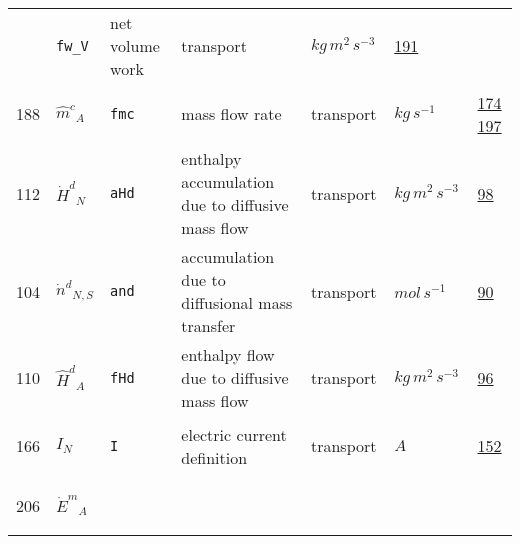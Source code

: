 \begin{longtable}{|p{1cm}|p{2.5cm}|p{4.5cm}|p{8cm}|p{3.0cm}|p{3cm}|p{1cm}|}
             & \verb|fw_V|
             & net volume work
             & \begin{lay}transport \end{lay}
             & $ kg \,m^{2} \,s^{-3} \, $
             &                 \hyperlink{"e:191"}{ 191 }
                 \\
            188
             & \hypertarget{"v:188"}{ $ {{\hat{m}^c}}{_{A}} $}
             & \verb|fmc|
             & mass flow rate 
             & \begin{lay}transport \end{lay}
             & $ kg \,s^{-1} \, $
             &                 \hyperlink{"e:174"}{ 174 }
                                 \hyperlink{"e:197"}{ 197 }
                 \\
            112
             & \hypertarget{"v:112"}{ $ {{\dot{H}^d}}{_{N}} $}
             & \verb|aHd|
             & enthalpy accumulation due to diffusive mass flow
             & \begin{lay}transport \end{lay}
             & $ kg \,m^{2} \,s^{-3} \, $
             &                 \hyperlink{"e:98"}{ 98 }
                 \\
            104
             & \hypertarget{"v:104"}{ $ {{\dot{n}^d}}{_{N, S}} $}
             & \verb|and|
             & accumulation due to diffusional mass transfer
             & \begin{lay}transport \end{lay}
             & $ mol \,s^{-1} \, $
             &                 \hyperlink{"e:90"}{ 90 }
                 \\
            110
             & \hypertarget{"v:110"}{ $ {{\hat{H}^d}}{_{A}} $}
             & \verb|fHd|
             & enthalpy flow due to diffusive mass flow
             & \begin{lay}transport \end{lay}
             & $ kg \,m^{2} \,s^{-3} \, $
             &                 \hyperlink{"e:96"}{ 96 }
                 \\
            166
             & \hypertarget{"v:166"}{ $ {I}{_{N}} $}
             & \verb|I|
             & electric current definition
             & \begin{lay}transport \end{lay}
             & $ A \, $
             &                 \hyperlink{"e:152"}{ 152 }
                 \\
            206
             & \hypertarget{"v:206"}{ $ {{\dot{E}^m}}{_{A}} $}

\end{longtable}
